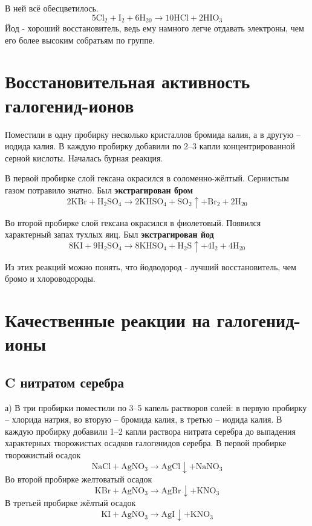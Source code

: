 \documentclass[a4paper,12pt]{article}
\begin{document}
В ней всё обесцветилось.
\begin{equation} 
\mathrm{5Cl_2 + I_2 + 6H_20 \longrightarrow 10HCl + 2HIO_3} 
\end{equation}
Йод - хороший восстановитель, ведь ему намного легче отдавать электроны, чем его более высоким собратьям по группе. 
\section{Восстановительная активность галогенид-ионов}
Поместили в одну пробирку несколько кристаллов бромида калия, а в другую – иодида калия.
В каждую пробирку добавили по 2–3 капли концентрированной серной кислоты. Началась бурная
реакция.

В первой пробирке слой гексана окрасился в соломенно-жёлтый. Сернистым газом потравило знатно. Был \textbf{экстрагирован бром}
\begin{equation} 
\mathrm{2KBr+ H_2SO_4  \longrightarrow 2KHSO_4 + SO_2\uparrow + Br_2 +2H_20} 
\end{equation}

Во второй пробирке слой гексана окрасился в фиолетовый. Появился характерный запах тухлых яиц. Был \textbf{экстрагирован йод}
\begin{equation} 
\mathrm{8KI + 9H_2SO_4  \longrightarrow 8KHSO_4 +H_2S \uparrow + 4I_2 +4H_20}
\end{equation}

Из этих реакций можно понять, что йодводород - лучший восстановитель, чем бромо и хлороводороды.
\section{Качественные реакции на галогенид-ионы}
\subsection{C нитратом серебра}
а) В три пробирки поместили по 3–5 капель растворов солей: в первую пробирку – хлорида
натрия, во вторую – бромида калия, в третью – иодида калия. В каждую пробирку добавили 1–2
капли раствора нитрата серебра до выпадения характерных творожистых осадков галогенидов
серебра. 
В первой пробирке творожистый осадок
\begin{equation} 
\mathrm{NaCl + AgNO_3  \longrightarrow AgCl\downarrow + NaNO_3 } 
\end{equation}
Во второй пробирке желтоватый осадок
\begin{equation} 
\mathrm{KBr + AgNO_3  \longrightarrow AgBr\downarrow + KNO_3 } 
\end{equation}
В третьей пробирке жёлтый осадок
\begin{equation} 
\mathrm{KI + AgNO_3  \longrightarrow AgI\downarrow + KNO_3 } 
\end{equation}
\end{document}
